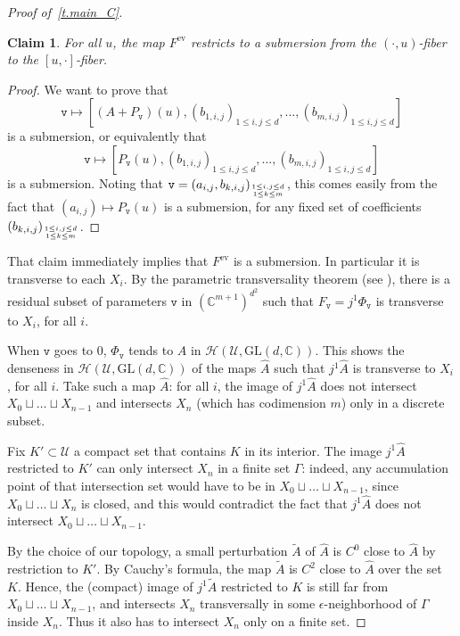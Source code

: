 \documentclass[10pt, a4paper]{amsart}
\theoremstyle{plain}
\newtheorem{claim}[lemma]{Claim}
\theoremstyle{definition}
\theoremstyle{remark}
\theoremstyle{note}
\numberwithin{equation}{section}
\begin{document}
\begin{proof}[Proof of~\cref{t.main_C}]
\begin{claim} For all $u$, the map $F^\mathrm{ev}$ restricts to a submersion from the $(\cdot,u)$-fiber to the $\left[u,\cdot\right]$-fiber. 
\end{claim}

\begin{proof}
We want to prove that $$\mathtt{v}\mapsto \left[(A+P_\mathtt{v})(u),\left(b_{1,i,j}\right)_{1\leq i,j\leq d},\ldots,\left(b_{m,i,j}\right)_{1\leq i,j\leq d}\right]$$
is a submersion, or equivalently that
$$\mathtt{v}\mapsto \left[P_\mathtt{v}(u),\left(b_{1,i,j}\right)_{1\leq i,j\leq d},\ldots,\left(b_{m,i,j}\right)_{1\leq i,j\leq d}\right]$$
is a submersion. Noting that $\mathtt{v}=(a_{i,j},b_{k,i,j})_{1\leq i,j\leq d \atop 1\leq k\leq m}$, this comes easily from the fact that $(a_{i,j})\mapsto P_\mathtt{v}(u)$ is a submersion, for any fixed set of coefficients $(b_{k,i,j})_{1\leq i,j\leq d \atop 1\leq k\leq m}$.
\end{proof}

That claim immediately implies that $F^\mathrm{ev}$ is a submersion. In particular it is transverse to each $X_i$. By the parametric transversality theorem (see \cite[p.~79]{Hirsch}), 
there is a residual subset of parameters $\mathtt{v}$ in $\left({\mathbb{C}}^{m+1}\right)^{d^2}$ such that $F_\mathtt{v}=j^1\Phi_\mathtt{v}$ is transverse to $X_i$, for all $i$.

When $\mathtt{v}$ goes to $0$, $\Phi_\mathtt{v}$ tends to $A$ in $\mathcal{H}\left({\mathcal{U}},{\mathrm{GL}}(d,{\mathbb{C}})\right)$. 
This shows the denseness in $\mathcal{H}\left({\mathcal{U}},{\mathrm{GL}}(d,{\mathbb{C}})\right)$ of the maps $\hat{A}$ such that $j^1\hat{A}$ is transverse to $X_i$, for all $i$.
Take such a map $\hat{A}$: for all $i$, the image of $j^1\hat{A}$ does not intersect $X_0\sqcup  \dots  \sqcup X_{n-1}$ and intersects $X_n$ (which has codimension $m$) only in a discrete subset.

Fix $K'\subset {\mathcal{U}}$ a compact set that contains $K$ in its interior. The image $j^1\hat{A}$ restricted to $K'$ can only intersect $X_n$ in a finite set $\Gamma$: indeed, any accumulation point of that intersection set would have to be in $X_0\sqcup  \dots  \sqcup X_{n-1}$, since $X_0\sqcup\ldots\sqcup X_n$ is closed, and this would contradict the fact that $j^1\hat{A}$ does not intersect $X_0\sqcup  \dots  \sqcup X_{n-1}$.

By the choice of our topology, a small perturbation $\tilde{A}$ of $\hat{A}$ is $C^0$ close to $\hat{A}$ by restriction to $K'$. By Cauchy's formula, the map $\tilde{A}$ is $C^2$ close to $\hat{A}$ over the set $K$. Hence, the (compact) image of $j^1\tilde{A}$ restricted to $K$ is still far from $X_0\sqcup  \dots  \sqcup X_{n-1}$, and intersects $X_n$ transversally in some $\epsilon$-neighborhood of $\Gamma$ inside $X_n$. Thus it also has to intersect $X_n$ only on a finite set. 


\end{proof}
\end{document}
